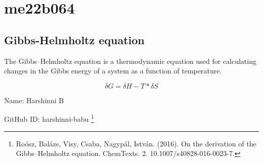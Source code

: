 
\section{me22b064}

\subsection{Gibbs-Helmholtz equation}

The Gibbs–Helmholtz equation is a thermodynamic equation used for calculating changes in the Gibbs energy of a system as a function of temperature. 

$$\delta G = \delta H - T * \delta S$$
 
Name: Harshinni B 

GitHub ID: harshinni-babu
\footnote{Roósz, Balázs, Visy, Csaba, Nagypál, István. (2016). On the derivation of the Gibbs–Helmholtz equation. ChemTexts. 2. 10.1007/s40828-016-0023-7. }
